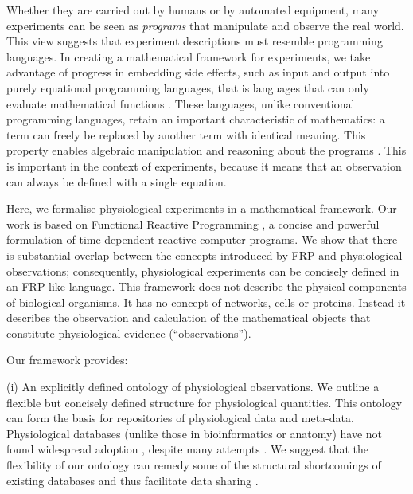 Whether they are carried out by humans or by automated equipment, many
experiments can be seen as \emph{programs} that manipulate and observe
the real world. This view suggests that experiment descriptions must
resemble programming languages. In creating a mathematical framework
for experiments, we take advantage of progress in embedding side
effects, such as input and output \citep{PeytonJones2002, Roy2004,
  Wadler1995} into purely equational programming languages, that is
languages that can only evaluate mathematical functions
\citep{Church1941}. These languages, unlike conventional programming
languages, retain an important characteristic of mathematics: a term
can freely be replaced by another term with identical meaning.
This property \citep[referential transparency;][]{Whitehead1927} enables
algebraic manipulation and reasoning about the programs
\citep{Bird1996}. This is important in the context of experiments,
because it means that an observation can always be defined with a
single equation.

Here, we formalise physiological experiments in a mathematical
framework. Our work is based on Functional Reactive Programming
\citep[FRP;][]{Elliott1997, Nilsson2002}, a concise and powerful
formulation of time-dependent reactive computer programs. We show that
there is substantial overlap between the concepts introduced by FRP
and physiological observations; consequently, physiological
experiments can be concisely defined in an FRP-like language. This
framework does not describe the physical components of biological
organisms. It has no concept of networks, cells or proteins. Instead
it describes the observation and calculation of the mathematical
objects that constitute physiological evidence (``observations'').

Our framework provides:

(i) An explicitly defined ontology of physiological observations. We
outline a flexible but concisely defined structure for physiological
quantities. This ontology can form the basis for repositories of
physiological data and meta-data. Physiological databases (unlike
those in bioinformatics or anatomy) have not found widespread adoption
\citep{Herz2008, Amari2002}, despite many attempts \citep{Katz2010,
  Teeters2008, Gardner2004, Jessop2010}. We suggest that the
flexibility of our ontology can remedy some of the structural
shortcomings of existing databases \citep{Gardner2005, Amari2002} and
thus facilitate data sharing \citep{Insel2003}.

